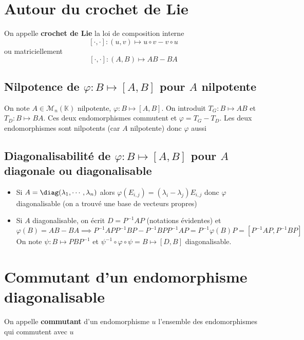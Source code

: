 \section{Autour du crochet de Lie}

\begin{dfn}
    On appelle \textbf{crochet de Lie} la loi de composition interne \[
        [\cdot, \cdot]: (u, v)\longmapsto u\circ v-v\circ u
    \]
    ou matriciellement \[
        [\cdot, \cdot]: (A, B)\longmapsto AB-BA
    \]
\end{dfn}

\subsection{Nilpotence de {$\varphi: B\longmapsto [A,B]$} pour $A$ nilpotente}

On note $A\in\mathcal M_n(\mathbb K)$ nilpotente, $\varphi:B\longmapsto [A, B]$. On introduit $T_G:B\longmapsto AB$ et $T_D:B\longmapsto BA$. Ces deux endomorphismes commutent et $\varphi=T_G-T_D$. Les deux endomorphismes sont nilpotents (car $A$ nilpotente) donc $\varphi$ aussi

\subsection{Diagonalisabilité de {$\varphi: B\longmapsto [A, B]$} pour $A$ diagonale ou diagonalisable}

\begin{itemize}
    \item Si $A=\diag (\lambda_1, \cdots, \lambda_n)$ alors $\varphi(E_{i, j})=(\lambda_i-\lambda_j)E_{i,j}$ donc $\varphi$ diagonalisable (on a trouvé une base de vecteurs propres)
    \item Si $A$ diagonalisable, on écrit $D=P^{-1}AP$ (notations évidentes) et \[
            \varphi(B)=AB-BA\implies P^{-1}APP^{-1}BP-P^{-1}BPP^{-1}AP=P^{-1}\varphi(B)P=[P^{-1}AP, P^{-1}BP]
        \]
        On note $\psi:B\longmapsto PBP^{-1}$ et $\psi^{-1}\circ \varphi\circ \psi=B\longmapsto [D, B]$ diagonalisable.
\end{itemize}

\section{Commutant d'un endomorphisme diagonalisable}

\begin{dfn}
    On appelle \textbf{commutant} d'un endomorphisme $u$ l'ensemble des endomorphismes qui commutent avec $u$
\end{dfn}

